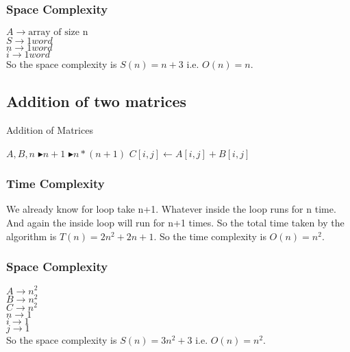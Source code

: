 \documentclass[twocolumn]{article}
\begin{document}
\subsubsection{Space Complexity}
$A \rightarrow \text{array of size n}$ \\
$S \rightarrow 1 word$ \\
$n \rightarrow 1 word$ \\
$i \rightarrow 1 word$ \\
So the space complexity is $S(n) = n + 3$ i.e. $O(n) = n$.

\subsection{Addition of two matrices}
\noindent
\begin{algorithm}
    \caption{Addition of Matrices}\label{matadd}
    \begin{algorithmic}
     {$A, B, n$}
         $\blacktriangleright{ n+1 }$
             $\blacktriangleright{ n * (n+1) }$
                \State $C[i, j] \gets A[i, j] + B[i, j]$ 
            \EndFor
        \EndFor
    \EndProcedure
    \end{algorithmic}
\end{algorithm}

\subsubsection{Time Complexity}
\noindent
We already know for loop take n+1. Whatever inside the loop runs for n time. And again the inside loop will run for n+1 times. So the total time taken by the algorithm is $T(n) = 2n^2 + 2n + 1$. So the time complexity is $O(n) = n^2$.

\subsubsection{Space Complexity}
\noindent
$A \rightarrow n^2$ \\
$B \rightarrow n^2$ \\
$C \rightarrow n^2$ \\
$n \rightarrow 1$ \\
$i \rightarrow 1$ \\
$j \rightarrow 1$ \\
So the space complexity is $S(n) = 3n^2 + 3$ i.e. $O(n) = n^2$.
\end{document}
